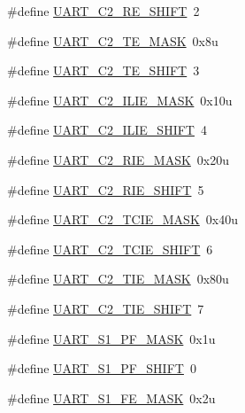 \begin{DoxyCompactItemize}
\#define \hyperlink{group___u_a_r_t___register___masks_ga65bf907ff7aaa0afeb5a3c34ff3a4b2c}{U\+A\+R\+T\+\_\+\+C2\+\_\+\+R\+E\+\_\+\+S\+H\+I\+FT}~2
\item 
\#define \hyperlink{group___u_a_r_t___register___masks_ga3ac02e42b689641339aadf50ba868492}{U\+A\+R\+T\+\_\+\+C2\+\_\+\+T\+E\+\_\+\+M\+A\+SK}~0x8u
\item 
\#define \hyperlink{group___u_a_r_t___register___masks_ga249d6d4f12178dac9cb19afecf1b165c}{U\+A\+R\+T\+\_\+\+C2\+\_\+\+T\+E\+\_\+\+S\+H\+I\+FT}~3
\item 
\#define \hyperlink{group___u_a_r_t___register___masks_ga646831f578232754b613c506d70eb282}{U\+A\+R\+T\+\_\+\+C2\+\_\+\+I\+L\+I\+E\+\_\+\+M\+A\+SK}~0x10u
\item 
\#define \hyperlink{group___u_a_r_t___register___masks_gaccb0ebb3f9bca9de659c4935cd895b06}{U\+A\+R\+T\+\_\+\+C2\+\_\+\+I\+L\+I\+E\+\_\+\+S\+H\+I\+FT}~4
\item 
\#define \hyperlink{group___u_a_r_t___register___masks_gaa2cb31ebff38bb70191a8852eb0216aa}{U\+A\+R\+T\+\_\+\+C2\+\_\+\+R\+I\+E\+\_\+\+M\+A\+SK}~0x20u
\item 
\#define \hyperlink{group___u_a_r_t___register___masks_ga586c552161616eeaf685b689dde5543a}{U\+A\+R\+T\+\_\+\+C2\+\_\+\+R\+I\+E\+\_\+\+S\+H\+I\+FT}~5
\item 
\#define \hyperlink{group___u_a_r_t___register___masks_ga74dd6677d7d42454ae44951e847f13bc}{U\+A\+R\+T\+\_\+\+C2\+\_\+\+T\+C\+I\+E\+\_\+\+M\+A\+SK}~0x40u
\item 
\#define \hyperlink{group___u_a_r_t___register___masks_ga65e55db1b4ca8940fee39d77256fbcaf}{U\+A\+R\+T\+\_\+\+C2\+\_\+\+T\+C\+I\+E\+\_\+\+S\+H\+I\+FT}~6
\item 
\#define \hyperlink{group___u_a_r_t___register___masks_ga0b4f935e44fda4076d7c8964c9d1e409}{U\+A\+R\+T\+\_\+\+C2\+\_\+\+T\+I\+E\+\_\+\+M\+A\+SK}~0x80u
\item 
\#define \hyperlink{group___u_a_r_t___register___masks_gaa216636f49f8f34524a376362792be1c}{U\+A\+R\+T\+\_\+\+C2\+\_\+\+T\+I\+E\+\_\+\+S\+H\+I\+FT}~7
\item 
\#define \hyperlink{group___u_a_r_t___register___masks_ga4116bba67a2cf49c9623e62e3b499ee3}{U\+A\+R\+T\+\_\+\+S1\+\_\+\+P\+F\+\_\+\+M\+A\+SK}~0x1u
\item 
\#define \hyperlink{group___u_a_r_t___register___masks_ga79ce3db2e0a8eaa687b01942adf36468}{U\+A\+R\+T\+\_\+\+S1\+\_\+\+P\+F\+\_\+\+S\+H\+I\+FT}~0
\item 
\#define \hyperlink{group___u_a_r_t___register___masks_ga83b62a5246fdb7f0aaaffb92074c9e0f}{U\+A\+R\+T\+\_\+\+S1\+\_\+\+F\+E\+\_\+\+M\+A\+SK}~0x2u

\end{DoxyCompactItemize}
